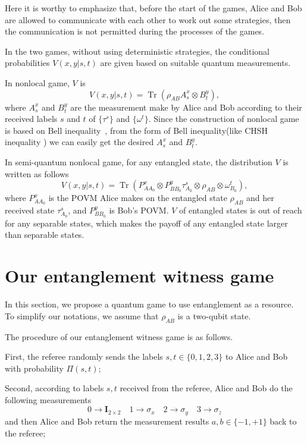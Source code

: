 \documentclass[twocolumn,pra,showpacs,superscriptaddress]{revtex4-1}
\DeclareMathOperator{\Tr}{Tr}
\begin{document}
Here it is worthy to emphasize that, before the start of the games,
Alice and Bob are allowed to communicate with each other to work out
some strategies, then the communication is not permitted during the
processes of the games.




In the two games, without using deterministic strategies, the
conditional probabilities $V(x,y|s,t)$ are given based on suitable
quantum measurements.

In nonlocal game, $V$ is
\begin{equation}
  V(x,y|s,t) = \Tr(\rho_{AB} A^x_s\otimes B^y_t),
\end{equation}
where $A^x_s$ and $B^y_t$ are the measurement make by Alice and Bob
according to their received labels $s$ and $t$ of $\{\tau^{s}\}$ and
$\{\omega^{t}\}$. Since the construction of nonlocal game is based on
Bell inequality~\cite{cle}, from the form of Bell inequality(like CHSH
inequality ) we can easily get the desired $A^x_s$ and $B^y_t$.

In semi-quantum nonlocal game, for any entangled state, the
distribution $V$ is written as follows
\begin{equation}
 V(x,y|s,t) = \Tr(P^x_{AA_0}\otimes P^y_{BB_0}
 \tau^s_{A_0}\otimes\rho_{AB}\otimes\omega^t_{B_0}),
\end{equation}
where $P^x_{AA_0}$ is the POVM Alice makes on the entangled state
$\rho_{AB}$ and her received state $\tau^s_{A_0}$, and $P^y_{BB_0}$ is
Bob's POVM. $V$ of entangled states is out of reach for any separable
states, which makes the payoff of any entangled state larger than
separable states.

\section{Our entanglement witness game}

In this section, we propose a quantum game to use entanglement as a
resource. To simplify our notations, we assume that $\rho_{AB}$ is a
two-qubit state.

The procedure of our entanglement witness game is as follows.

First, the referee randomly sends the labels $s,t\in\{0,1,2,3\}$ to
Alice and Bob with probability $\Pi(s,t)$;

Second, according to labels $s,t$ received from the referee,
Alice and Bob do the following measurements
\begin{equation}
    0\rightarrow \textbf{I}_{2\times2}\quad 1\rightarrow \sigma_x
    \quad 2\rightarrow \sigma_y \quad 3\rightarrow \sigma_z
    \label{measurement}
\end{equation}
and then Alice and Bob return the measurement results
$a,b\in\{-1,+1\}$ back
to the referee;
\end{document}
